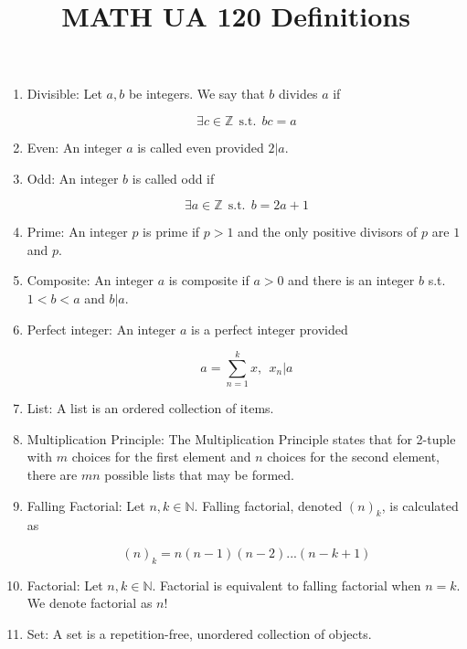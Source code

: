 \documentclass{article}
\title{MATH UA 120 Definitions}
\date{}
\begin{document}
\maketitle

\begin{enumerate}
    \item Divisible: Let $a,b$ be integers. We say that $b$ divides $a$ if 
    
    $$\exists c\in\mathbb{Z}\:\: \text{s.t.} \:\: bc=a$$
    
    \item Even: An integer $a$ is called even provided $2|a$.
    
    \item Odd: An integer $b$ is called odd if
    
    $$\exists a\in\mathbb{Z} \:\: \text{s.t.} \:\: b=2a+1$$
    
    \item Prime: An integer $p$ is prime if $p>1$ and the only positive divisors of $p$ are $1$ and $p$.
    
    \item Composite: An integer $a$ is composite if $a>0$ and there is an integer $b$ s.t. $1<b<a$ and $b|a$.
    
    \item Perfect integer: An integer $a$ is a perfect integer provided 
    
    $$a=\sum_{n=1}^k x,\:\: x_n|a$$
    
    \item List: A list is an ordered collection of items.
    
    \item Multiplication Principle: The Multiplication Principle states that for 2-tuple with $m$ choices for the first element and $n$ choices for the second element, there are $mn$ possible lists that may be formed.
    
    \item Falling Factorial: Let $n,k\in\mathbb{N}$. Falling factorial, denoted $(n)_k$, is calculated as
    
    $$(n)_k=n(n-1)(n-2)...(n-k+1)$$
    
    \item Factorial: Let $n,k\in\mathbb{N}$. Factorial is equivalent to falling factorial when $n=k$. We denote factorial as $n!$
    
    \item Set: A set is a repetition-free, unordered collection of objects.
    

\end{enumerate}
\end{document}
